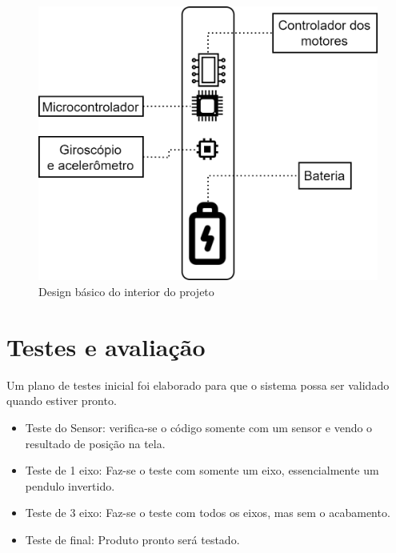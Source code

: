 \begin{figure}[H]
    \centering
    \includegraphics[width=1\textwidth,angle=0]{figures/Design-Page-2.png}
    \caption{Design básico do interior do projeto}
\end{figure}

\section{Testes e avaliação}

Um plano de testes inicial foi elaborado para que o sistema possa ser validado quando estiver pronto.

\begin{itemize}
    \item Teste do Sensor: verifica-se o código somente com um sensor e vendo o resultado de posição na tela.
    
    \item Teste de 1 eixo: Faz-se o teste com somente um eixo, essencialmente um pendulo invertido.
    
    \item Teste de 3 eixo: Faz-se o teste com todos os eixos, mas sem o acabamento.
    
    \item Teste de final: Produto pronto será testado.
\end{itemize}


